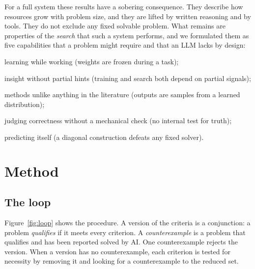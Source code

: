 \documentclass[11pt,a4paper]{article}
\theoremstyle{prob}
\begin{document}
For a full system these results have a sobering consequence. They describe how resources grow with problem size, and they are lifted by written reasoning and by tools. They do not exclude any fixed solvable problem. What remains are properties of the \emph{search} that such a system performs, and we formulated them as five capabilities that a problem might require and that an LLM lacks by design:
\begin{description}[leftmargin=1.6em,style=sameline,itemsep=1pt]
\item[F1] learning while working (weights are frozen during a task);
\item[F2] insight without partial hints (training and search both depend on partial signals);
\item[F3] methods unlike anything in the literature (outputs are samples from a learned distribution);
\item[F4] judging correctness without a mechanical check (no internal test for truth);
\item[F5] predicting itself (a diagonal construction defeats any fixed solver).
\end{description}

\section{Method}\label{sec:method}

\subsection{The loop}

Figure~\ref{fig:loop} shows the procedure. A version of the criteria is a conjunction: a problem \emph{qualifies} if it meets every criterion. A \emph{counterexample} is a problem that qualifies and has been reported solved by AI. One counterexample rejects the version. When a version has no counterexample, each criterion is tested for necessity by removing it and looking for a counterexample to the reduced set.
\end{document}
